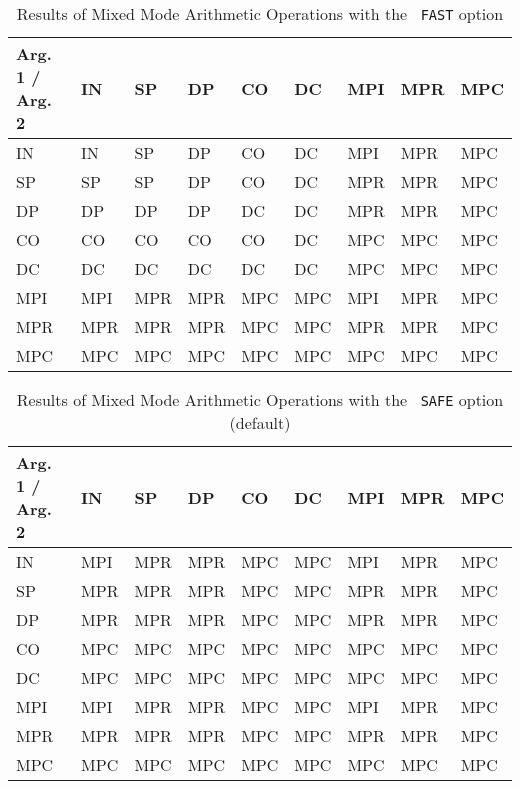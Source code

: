 \begin{table}[p] \begin{center}
\begin{tabular}{|l|l|l|l|l|l|l|l|l|}
\hline
Arg. 1 / Arg. 2 & IN  &  SP  &  DP  &  CO  &  DC  &  MPI &  MPR &  MPC \\
\hline
   IN           & IN  &  SP  &  DP  &  CO  &  DC  &  MPI &  MPR &  MPC \\
   SP           & SP  &  SP  &  DP  &  CO  &  DC  &  MPR &  MPR &  MPC \\
   DP           & DP  &  DP  &  DP  &  DC  &  DC  &  MPR &  MPR &  MPC \\
   CO           & CO  &  CO  &  CO  &  CO  &  DC  &  MPC &  MPC &  MPC \\
   DC           & DC  &  DC  &  DC  &  DC  &  DC  &  MPC &  MPC &  MPC \\
   MPI          & MPI &  MPR &  MPR &  MPC &  MPC &  MPI &  MPR &  MPC \\
   MPR          & MPR &  MPR &  MPR &  MPC &  MPC &  MPR &  MPR &  MPC \\
   MPC          & MPC &  MPC &  MPC &  MPC &  MPC &  MPC &  MPC &  MPC \\
\hline
\end{tabular}
\caption{Results of Mixed Mode Arithmetic Operations with the {\tt
FAST} option} 
\end{center} \end{table}

\begin{table}[p] \begin{center}
\begin{tabular}{|l|l|l|l|l|l|l|l|l|}
\hline
Arg. 1 / Arg. 2 & IN  &  SP  &  DP  &  CO  &  DC  &  MPI &  MPR &  MPC \\
\hline
   IN           & MPI &  MPR &  MPR &  MPC &  MPC &  MPI &  MPR &  MPC \\
   SP           & MPR &  MPR &  MPR &  MPC &  MPC &  MPR &  MPR &  MPC \\
   DP           & MPR &  MPR &  MPR &  MPC &  MPC &  MPR &  MPR &  MPC \\
   CO           & MPC &  MPC &  MPC &  MPC &  MPC &  MPC &  MPC &  MPC \\
   DC           & MPC &  MPC &  MPC &  MPC &  MPC &  MPC &  MPC &  MPC \\
   MPI          & MPI &  MPR &  MPR &  MPC &  MPC &  MPI &  MPR &  MPC \\
   MPR          & MPR &  MPR &  MPR &  MPC &  MPC &  MPR &  MPR &  MPC \\
   MPC          & MPC &  MPC &  MPC &  MPC &  MPC &  MPC &  MPC &  MPC \\
\hline
\end{tabular}
\caption{Results of Mixed Mode Arithmetic Operations with the {\tt
SAFE} option (default)}
\end{center} \end{table}

